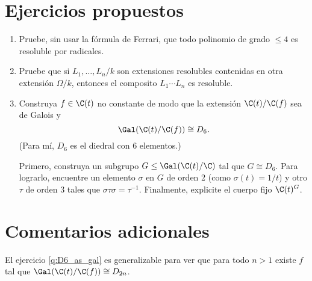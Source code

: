 \documentclass[11pt, reqno]{amsart}
\begin{document}
\section{Ejercicios propuestos}
\begin{enumerate}
	\item Pruebe, sin usar la fórmula de Ferrari, que todo polinomio de grado $\le 4$ es resoluble por radicales.
	\item Pruebe que si $L_1, \dots, L_n / k$ son extensiones resolubles contenidas en otra extensión $\Omega/k$,
		entonces el composito $L_1 \cdots L_n$ es resoluble.
	\item\label{q:D6_as_gal}\lookst
		Construya $f \in \C(t)$ no constante de modo que la extensión $\C(t)/\C(f)$ sea de Galois y
		\[
			\Gal( \C(t)/\C(f) ) \cong D_6.
		\]
		(Para mí, $D_6$ es el diedral con 6 elementos.)

		\begin{hint}
			Primero, construya un subgrupo $G \le \Gal(\C(t) / \C)$ tal que $G \cong D_6$.
			Para lograrlo, encuentre un elemento $\sigma$ en $G$ de orden 2 (como $\sigma(t) = 1/t$) y otro
			$\tau$ de orden 3 tales que $\sigma \tau \sigma = \tau^{-1}$.
			Finalmente, explicite el cuerpo fijo $\C(t)^G$.
		\end{hint}
\end{enumerate}

\section{Comentarios adicionales}
El ejercicio \ref{q:D6_as_gal} es generalizable para ver que para todo $n > 1$ existe $f$ tal que $\Gal(\C(t)/\C(f))
\cong D_{2n}$.


\printbibliography
\end{document}
